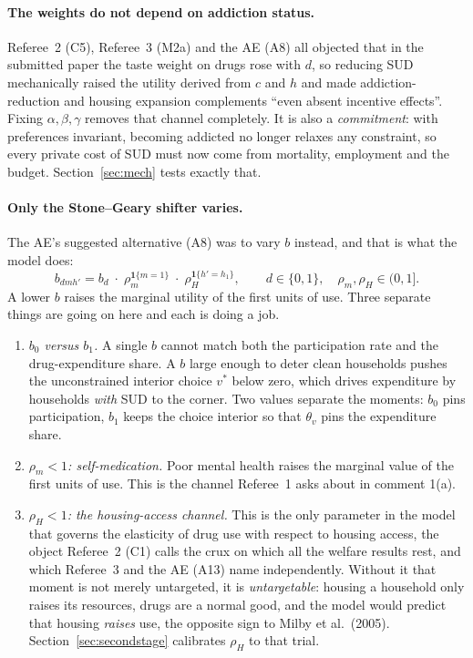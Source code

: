 \documentclass[11pt]{article}
\newcommand{\ind}[1]{\mathbf{1}\{#1\}}
\begin{document}
\paragraph{The weights do not depend on addiction status.} Referee~2 (C5),
Referee~3 (M2a) and the AE (A8) all objected that in the submitted paper the
taste weight on drugs rose with $d$, so reducing SUD mechanically raised the
utility derived from $c$ and $h$ and made addiction-reduction and housing
expansion complements ``even absent incentive effects''. Fixing
$\alpha,\beta,\gamma$ removes that channel completely. It is also a
\emph{commitment}: with preferences invariant, becoming addicted no longer
relaxes any constraint, so every private cost of SUD must now come from
mortality, employment and the budget. Section~\ref{sec:mech} tests exactly that.

\paragraph{Only the Stone--Geary shifter varies.} The AE's suggested alternative
(A8) was to vary $b$ instead, and that is what the model does:
\begin{equation}
b_{dmh'}=b_d\;\cdot\;\rho_m^{\ind{m=1}}\;\cdot\;\rho_H^{\ind{h'=h_1}},
\qquad d\in\{0,1\},\quad \rho_m,\rho_H\in(0,1].
\label{eq:b}
\end{equation}
A lower $b$ raises the marginal utility of the first units of use. Three
separate things are going on here and each is doing a job.

\begin{enumerate}
\item \emph{$b_0$ versus $b_1$.} A single $b$ cannot match both the
participation rate and the drug-expenditure share. A $b$ large enough to deter
clean households pushes the unconstrained interior choice $v^{*}$ below zero,
which drives expenditure by households \emph{with} SUD to the corner. Two values
separate the moments: $b_0$ pins participation, $b_1$ keeps the choice interior
so that $\theta_v$ pins the expenditure share.

\item \emph{$\rho_m<1$: self-medication.} Poor mental health raises the marginal
value of the first units of use. This is the channel Referee~1 asks about in
comment 1(a).

\item \emph{$\rho_H<1$: the housing-access channel.} This is the only parameter
in the model that governs the elasticity of drug use with respect to housing
access, the object Referee~2 (C1) calls the crux on which all the welfare
results rest, and which Referee~3 and the AE (A13) name independently. Without
it that moment is not merely untargeted, it is \emph{untargetable}: housing a
household only raises its resources, drugs are a normal good, and the model would
predict that housing \emph{raises} use, the opposite sign to Milby et al.\
(2005). Section~\ref{sec:secondstage} calibrates $\rho_H$ to that trial.
\end{enumerate}
\end{document}
